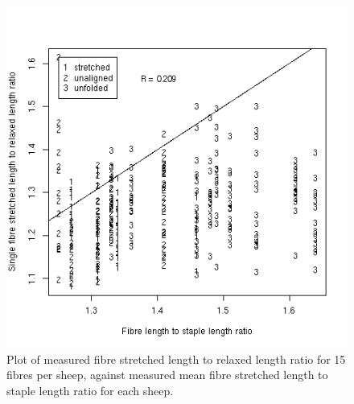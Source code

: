 %

\begin{figure}[!h]
  \centering
  \includegraphics[width=1.1\textwidth]{figfibrelftolslftolr.png}
  \caption{Plot of measured fibre stretched length to relaxed length ratio for 15 fibres per sheep, against measured mean fibre stretched length to staple length ratio for each sheep. }
  \label{fig:fibrelftolslftolr}
\end{figure}

%

